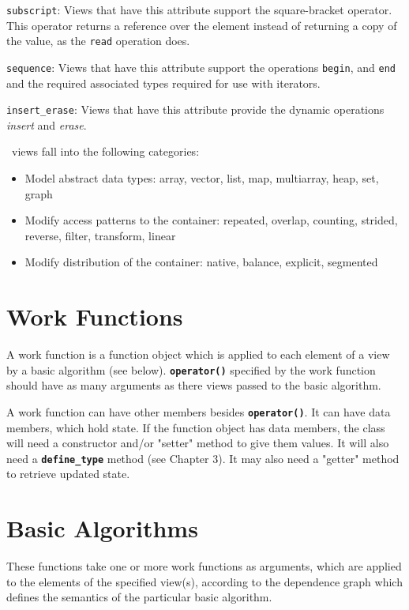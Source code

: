 \documentclass{report}
\begin{document}
\texttt{subscript}:
Views that have this attribute support the square-bracket operator.
This operator returns a reference over the element instead of
returning a copy of the value, as the
\texttt{read}
operation does.

\texttt{sequence}:
Views that have this attribute support the operations
\texttt{begin},
and
\texttt{end}
and the required associated types
required for use with iterators.

\texttt{insert\_erase}:
Views that have this attribute provide the dynamic
operations \emph{insert} and \emph{erase}.

\stapl\ views fall into the following categories:

\begin{itemize}
\item
Model abstract data types:
\newline
array, vector, list, map, multiarray, heap, set, graph
\item
Modify access patterns to the container:
\newline
repeated, overlap, counting, strided, reverse, filter, transform, linear
\item
Modify distribution of the container:
\newline
native, balance, explicit, segmented
\end{itemize}

\section{Work Functions}

A work function is a function object which is applied to each element
of a view by a basic algorithm (see below).
\texttt{{\bf operator()}}
specified by the work function
should have as many arguments as there views passed to the basic algorithm.

A work function can have other members besides
\texttt{{\bf operator()}}.
It can have data members, which hold state.
If the function object has data members, the class will need
a constructor and/or "setter" method to give them values.  It will
also need a
\texttt{{\bf define\_type}}
method (see Chapter 3).
It may also need a "getter" method to retrieve updated state.

\section{Basic Algorithms}

These functions take one or more work functions as arguments,
which are applied to the elements of the specified view(s),
according to the dependence graph which defines the semantics
of the particular basic algorithm.
\end{document}
